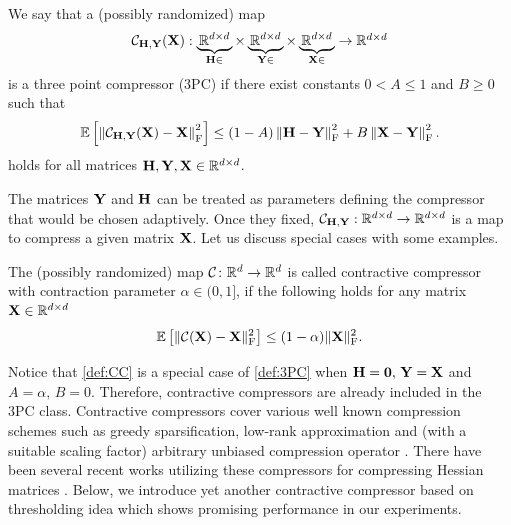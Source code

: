 \documentclass[11pt]{article}
\begin{document}
	
	\begin{definition}
		We say that a (possibly randomized) map
		\begin{equation}\label{def:3PC}
			\textstyle
			{\mathcal{C}}_{\mathbf{H}, \mathbf{Y}}(\mathbf{X}): \underbrace{\,\mathbb{R}^{d\times d}\,}_{\mathbf{H}\in} \times \underbrace{\,\mathbb{R}^{d\times d}\,}_{\mathbf{Y}\in} \times \underbrace{\,\mathbb{R}^{d\times d}\,}_{\mathbf{X}\in} \to \mathbb{R}^{d\times d}
		\end{equation}
		is a three point compressor (3PC) if there exist constants $0 < A\leq 1$ and $B \geq 0$ such that
		\begin{equation}\label{def:3PC_comp}
			\mathbb{E}\left[\left\|{\mathcal{C}}_{\mathbf{H},\mathbf{Y}}(\mathbf{X}) - \mathbf{X}\right\|^2_{\rm F}\right] \leq (1-A)\left\|\mathbf{H}-\mathbf{Y}\right\|^2_{\rm F} + B\left\|\mathbf{X}-\mathbf{Y}\right\|^2_{\rm F}.
		\end{equation}
		holds for all matrices $\mathbf{H}, \mathbf{Y}, \mathbf{X} \in \mathbb{R}^{d\times d}$.
	\end{definition}
	
	The matrices $\mathbf{Y}$ and $\mathbf{H}$ can be treated as parameters defining the compressor that would be chosen adaptively. Once they fixed, ${\mathcal{C}}_{\mathbf{H},\mathbf{Y}}:\mathbb{R}^{d\times d} \to \mathbb{R}^{d\times d}$ is a map to compress a given matrix $\mathbf{X}$. Let us discuss special cases with some examples.
	
	
	
	\begin{example} The (possibly randomized) map ${\mathcal{C}}\colon\mathbb{R}^d\to\mathbb{R}^d$ is called contractive compressor with contraction parameter $\alpha\in(0,1]$, if the following holds for any matrix $\mathbf{X}\in\mathbb{R}^{d\times d}$
		\begin{equation}\label{def:CC}
			\mathbb{E}\left[\|{\mathcal{C}}(\mathbf{X}) - \mathbf{X}\|^2_{\rm F}\right] \le (1-\alpha)\|\mathbf{X}\|^2_{\rm F}.
		\end{equation}
	\end{example}
	
	Notice that \eqref{def:CC} is a special case of \eqref{def:3PC} when $\mathbf{H}=\bm{0},\, \mathbf{Y}=\mathbf{X}$ and $A=\alpha,\, B=0$. Therefore, contractive compressors are already included in the 3PC class. Contractive compressors cover various well known compression schemes such as greedy sparsification, low-rank approximation and (with a suitable scaling factor) arbitrary unbiased compression operator \citep{biased2020}. There have been several recent works utilizing these compressors for compressing Hessian matrices \citep{DAN-LA2020,Alimisis2021QNewton,Islamov2021NewtonLearn,FedNL2021,qian2021basis,IOSFabbro2022}. Below, we introduce yet another contractive compressor based on thresholding idea which shows promising performance in our experiments.
	
\end{document}
